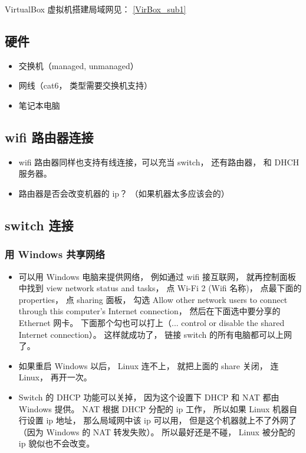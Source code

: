 
\begin{issues}
\issueDraft
\end{issues}


VirtualBox 虚拟机搭建局域网见： \autoref{VirBox_sub1}~

\subsection{硬件}
\begin{itemize}
\item 交换机（managed, unmanaged）
\item 网线（cat6， 类型需要交换机支持）
\item 笔记本电脑
\end{itemize}

\subsection{wifi 路由器连接}
\begin{itemize}
\item wifi 路由器同样也支持有线连接，可以充当 switch， 还有路由器， 和 DHCH 服务器。
\item 路由器是否会改变机器的 ip？ （如果机器太多应该会的）
\end{itemize}

\subsection{switch 连接}
\subsubsection{用 Windows 共享网络}
\begin{itemize}
\item 可以用 Windows 电脑来提供网络， 例如通过 wifi 接互联网， 就再控制面板中找到 view network status and tasks， 点 Wi-Fi 2 (Wifi 名称)， 点最下面的 properties， 点 sharing 面板， 勾选 Allow other network users to connect through this computer's Internet connection， 然后在下面选中要分享的 Ethernet 网卡。 下面那个勾也可以打上（... control or disable the shared Internet connection）。 这样就成功了， 链接 switch 的所有电脑都可以上网了。
\item 如果重启 Windows 以后， Linux 连不上， 就把上面的 share 关闭， 连 Linux， 再开一次。
\item Switch 的 DHCP 功能可以关掉， 因为这个设置下 DHCP 和 NAT 都由 Windows 提供。 NAT 根据 DHCP 分配的 ip 工作， 所以如果 Linux 机器自行设置 ip 地址， 那么局域网中该 ip 可以用， 但是这个机器就上不了外网了（因为 Windows 的 NAT 转发失败）。 所以最好还是不碰， Linux 被分配的 ip 貌似也不会改变。
\end{itemize}


